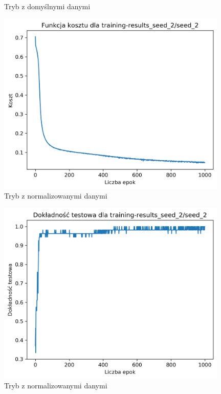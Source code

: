 \documentclass{classrep}
\begin{document}
{{{\begin{figure}[!htbp]
                    \caption{Tryb z domyślnymi danymi}
                \end{figure}
                \FloatBarrier
                \begin{figure}[!htbp]
                    \centering
                    \includegraphics[width=110mm]{wykresy/seed_2_cost.png}
                    \caption{Tryb z normalizowanymi danymi}
                \end{figure}
                \begin{figure}[!htbp]
                    \centering
                    \includegraphics[width=110mm]{wykresy/seed_2_testing-accuracy.png}
                    \caption{Tryb z normalizowanymi danymi}
                \end{figure}
                \begin{figure}[!htbp]
                    \centering

\end{figure}}}}
\end{document}
